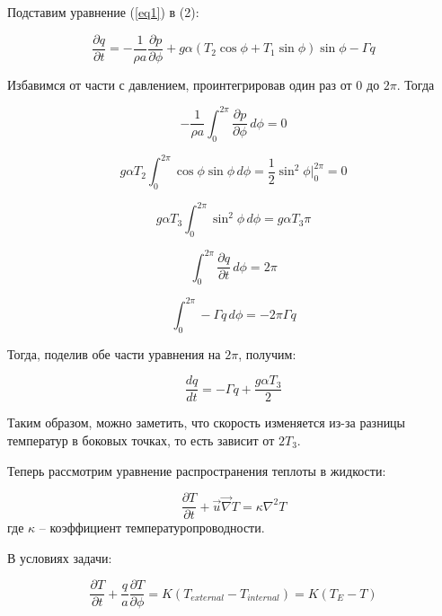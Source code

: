 \documentclass[12pt]{article}
\begin{document}
Подставим уравнение (\ref{eq1}) в (2):

\begin{equation*}
\frac{\partial q}{\partial t} = -\frac{1}{\rho a}\frac{\partial p}{\partial \phi} + g \alpha (T_2\cos\phi + T_1\sin\phi) \sin\phi -\Gamma q
\end{equation*}

Избавимся от части с давлением, проинтегрировав один раз от 0 до $2\pi$. Тогда 

\begin{equation*}
-\frac{1}{\rho a} \int_{0}^{2\pi} \frac{\partial p}{\partial \phi}\, d\phi = 0
\end{equation*}

\begin{equation*}
g \alpha T_2 \int_{0}^{2\pi} \cos\phi \sin\phi\, d\phi = \frac{1}{2} \sin^2 \phi \Big|_0^{2\pi} = 0
\end{equation*}

\begin{equation*}
g \alpha T_3 \int_{0}^{2\pi} \sin^2 \phi\, d\phi = g \alpha T_3 \pi
\end{equation*}

\begin{equation*}
\int_{0}^{2\pi} \frac{\partial q}{\partial t}\, d\phi = 2\pi
\end{equation*}

\begin{equation*}
\int_{0}^{2\pi} -\Gamma q\, d\phi = -2\pi\Gamma q
\end{equation*}

Тогда, поделив обе части уравнения на $2\pi$, получим:

\begin{equation}\label{eq23}
\frac{dq}{dt} = -\Gamma q + \frac{g \alpha T_3}{2}
\end{equation}

Таким образом, можно заметить, что скорость изменяется из-за разницы температур в боковых точках, то есть зависит от $2T_3$.

Теперь рассмотрим уравнение распространения теплоты в жидкости:

\begin{equation*}
\frac{\partial T}{\partial t} + \overrightarrow{u} \overrightarrow{\nabla} T = \kappa \nabla^2 T 
\end{equation*}
где $\kappa$ -- коэффициент температуропроводности.

В условиях задачи:

\begin{equation}\label{eq3}
\frac{\partial T}{\partial t} + \frac{q}{a} \frac{\partial T}{\partial \phi} = K(T_{external}-T_{internal}) = K(T_E-T)
\end{equation}
\end{document}
